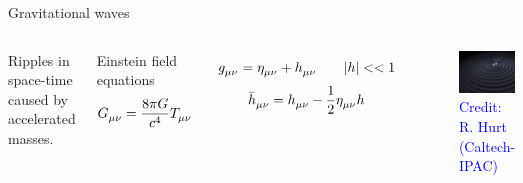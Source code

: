 \documentclass[pdf]{beamer}
\newcommand{\credit}[1]{\tiny{\textcolor{blue}{Credit: #1}}}
\begin{document}
\begin{frame}{Gravitational waves}
 \begin{columns}
 	\hspace{.5cm}
    Ripples in space-time caused by accelerated masses.
        
	
	\begin{block}{Einstein field equations}
	\begin{equation*}
    \tensor{G}{_\mu_\nu} = \dfrac{8\pi G}{c^4} \tensor{T}{_\mu_\nu}  
    \end{equation*}
	\end{block}
	
	
    \begin{equation*}
    \tensor{g}{_\mu_\nu} = \tensor{\eta}{_\mu_\nu} + \tensor{h}{_\mu_\nu} \qquad |h|<<1 
    \end{equation*}
    \begin{equation*}
    \tensor{\bar{h}}{_\mu_\nu} = \tensor{h}{_\mu_\nu} -\dfrac{1}{2} \tensor{\eta}{_\mu_\nu} h  
    \end{equation*}
    
    
    \begin{figure}
    \includegraphics[scale=.14]{fig/GravWave.jpg}
    \caption*{\credit{R. Hurt (Caltech-IPAC)}}
    \end{figure}
  \end{columns}

\end{frame}
\end{document}
